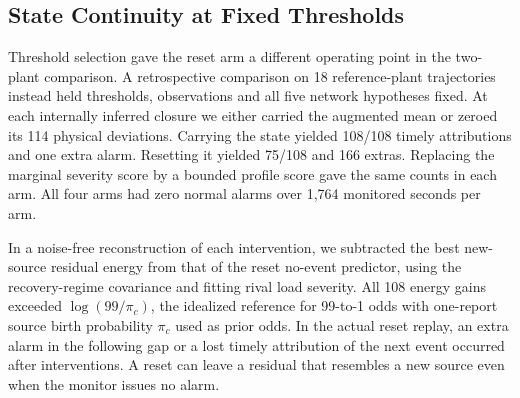 \subsection{State Continuity at Fixed Thresholds}
\label{sec:controlled-ablation}
Threshold selection gave the reset arm a different operating point in the
two-plant comparison. A retrospective comparison on 18 reference-plant
trajectories instead held thresholds, observations and all five network
hypotheses fixed. At each internally inferred closure we either carried
the augmented mean or zeroed its 114 physical deviations. Carrying the
state yielded 108/108 timely attributions and one extra alarm. Resetting
it yielded 75/108 and 166 extras. Replacing the marginal severity score
by a bounded profile score gave the same counts in each arm. All four
arms had zero normal alarms over 1,764 monitored seconds per arm.

In a noise-free reconstruction of each intervention, we subtracted the
best new-source residual energy from that of the reset no-event predictor,
using the recovery-regime covariance and fitting rival load severity.
All 108 energy gains exceeded $\log(99/\pi_c)$, the idealized reference
for 99-to-1 odds with one-report source birth probability $\pi_c$ used
as prior odds. In the actual reset replay, an extra alarm in the
following gap or a lost timely attribution of the next event occurred
after \RevResetHarm{} interventions. A reset can leave a residual
that resembles a new source even when the monitor issues no alarm.
